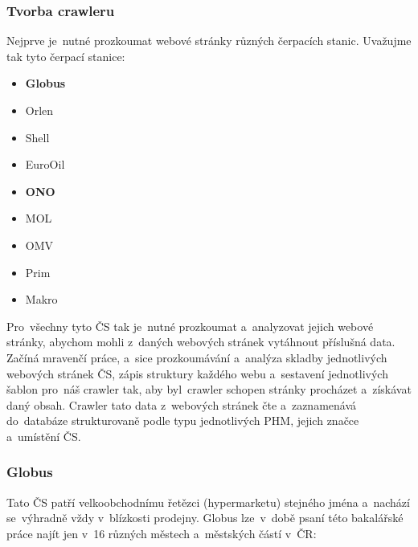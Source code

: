 \subsubsection{Tvorba crawleru}
\label{sec:crawler-preps}

Nejprve je~nutné prozkoumat webové stránky různých čerpacích stanic.
Uvažujme tak tyto čerpací stanice:

\begin{itemize}
    \item \textbf{Globus}
    \item Orlen
    \item Shell
    \item EuroOil
    \item \textbf{ONO}
    \item MOL
    \item OMV
    \item Prim
    \item Makro
\end{itemize}

Pro~všechny tyto ČS tak je~nutné prozkoumat a~analyzovat jejich webové
stránky, abychom mohli z~daných webových stránek vytáhnout příslušná data.
Začíná mravenčí práce, a~sice prozkoumávání a~analýza skladby jednotlivých
webových stránek ČS, zápis struktury každého webu a~sestavení jednotlivých
šablon pro~náš crawler tak, aby byl~crawler schopen stránky procházet
a~získávat daný obsah. Crawler tato data z~webových stránek čte a~zaznamenává
do~databáze strukturovaně podle typu jednotlivých PHM, jejich značce
a~umístění ČS.

\subsubsection{Globus}
\label{sec:preps-globus}

Tato ČS patří velkoobchodnímu řetězci (hypermarketu) stejného jména
a~nachází se~výhradně vždy v~blízkosti prodejny. Globus lze~v~době
psaní této bakalářské práce najít jen v~16 různých městech a~městských
částí v~ČR:

